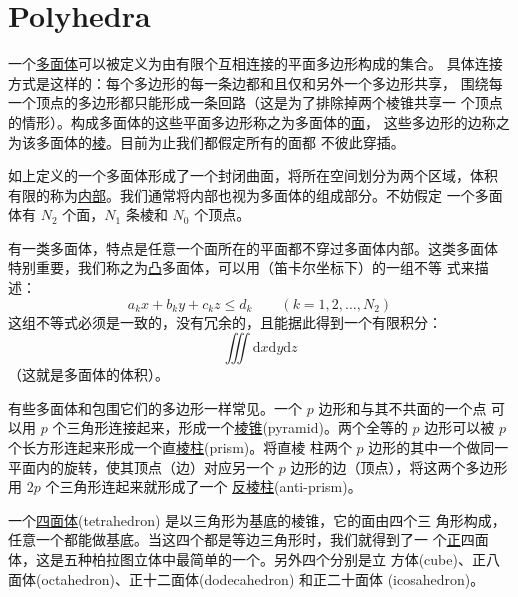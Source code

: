 \documentclass[cs4size,a4paper,adobefonts,openany]{ctexbook}
\newcommand{\pname}[1]{\underline{#1}}
\numberwithin{equation}{section}
\begin{document}
\section{Polyhedra}
一个\pname{多面体}可以被定义为由有限个互相连接的平面多边形构成的集合。
具体连接方式是这样的：每个多边形的每一条边都和且仅和另外一个多边形共享，
围绕每一个顶点的多边形都只能形成一条回路（这是为了排除掉两个棱锥共享一
  个顶点的情形）。构成多面体的这些平面多边形称之为多面体的\pname{面}，
这些多边形的边称之为该多面体的\pname{棱}。目前为止我们都假定所有的面都
不彼此穿插。

如上定义的一个多面体形成了一个封闭曲面，将所在空间划分为两个区域，体积
有限的称为\pname{内部}。我们通常将内部也视为多面体的组成部分。不妨假定
一个多面体有 $N_2$ 个面，$N_1$ 条棱和 $N_0$ 个顶点。

有一类多面体，特点是任意一个面所在的平面都不穿过多面体内部。这类多面体
特别重要，我们称之为\pname{凸}多面体，可以用（笛卡尔坐标下）的一组不等
式来描述：
\[
a_kx+b_ky+c_kz \leq d_k\qquad (k=1,2,\dots,N_2)
\]
这组不等式必须是一致的，没有冗余的，且能据此得到一个有限积分：
\[
\iiint\text{d}x\text{d}y\text{d}z
\]
（这就是多面体的体积）。

有些多面体和包围它们的多边形一样常见。一个 $p$ 边形和与其不共面的一个点
可以用 $p$ 个三角形连接起来，形成一个\pname{棱锥}(pyramid)。两个全等的
$p$ 边形可以被 $p$ 个长方形连起来形成一个直\pname{棱柱}(prism)。将直棱
柱两个 $p$ 边形的其中一个做同一平面内的旋转，使其顶点（边）对应另一个
$p$ 边形的边（顶点），将这两个多边形用 $2p$ 个三角形连起来就形成了一个
\pname{反棱柱}(anti-prism)。

一个\pname{四面体}(tetrahedron) 是以三角形为基底的棱锥，它的面由四个三
角形构成，任意一个都能做基底。当这四个都是等边三角形时，我们就得到了一
个\pname{正}四面体，这是五种柏拉图立体中最简单的一个。另外四个分别是立
方体(cube)、正八面体(octahedron)、正十二面体(dodecahedron) 和正二十面体
(icosahedron)。
\end{document}

